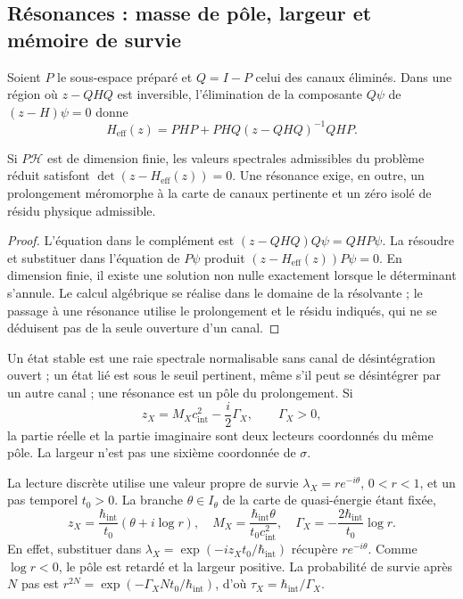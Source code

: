 \subsection{Résonances : masse de pôle, largeur et mémoire de survie}
\label{vi:vi:subsec:resonancias-familias}

Soient \(P\) le sous-espace préparé et \(Q=I-P\) celui des canaux
éliminés. Dans une région où \(z-QHQ\) est inversible, l’élimination
de la composante \(Q\psi\) de \((z-H)\psi=0\) donne
\begin{equation}
 H_{\mathrm{eff}}(z)=PHP+PHQ(z-QHQ)^{-1}QHP.
 \label{vi:vi:eq:feshbach-familias}
\end{equation}

\begin{proposition}
\label{vi:vi:prop:feshbach-familias}
Si \(P\mathcal H\) est de dimension finie, les valeurs spectrales
admissibles du problème réduit satisfont
\(\det(z-H_{\mathrm{eff}}(z))=0\). Une résonance exige, en outre,
un prolongement méromorphe à la carte de canaux pertinente et un zéro
isolé de résidu physique admissible.
\end{proposition}
\begin{proof}
L’équation dans le complément est
\((z-QHQ)Q\psi=QHP\psi\). La résoudre et substituer dans l’équation
de \(P\psi\) produit \((z-H_{\mathrm{eff}}(z))P\psi=0\).
En dimension finie, il existe une solution non nulle exactement lorsque
le déterminant s’annule. Le calcul algébrique se réalise dans le domaine
de la résolvante ; le passage à une résonance utilise le prolongement et le
résidu indiqués, qui ne se déduisent pas de la seule ouverture d’un canal.
\end{proof}

Un état stable est une raie spectrale normalisable sans canal de
désintégration ouvert ; un état lié est sous le seuil
pertinent, même s’il peut se désintégrer par un autre canal ; une résonance est un
pôle du prolongement. Si
\[
 z_X=M_Xc_{\mathrm{int}}^2-\frac{i}{2}\Gamma_X,
 \qquad\Gamma_X>0,
\]
la partie réelle et la partie imaginaire sont deux lecteurs coordonnés du même
pôle. La largeur n’est pas une sixième coordonnée de \(\sigma\).

La lecture discrète utilise une valeur propre de survie
\(\lambda_X=re^{-i\theta}\), \(0<r<1\), et un pas temporel
\(t_0>0\). La branche \(\theta\in I_\theta\) de la carte de
quasi-énergie étant fixée,
\begin{equation}
 z_X=\frac{\hbar_{\mathrm{int}}}{t_0}
 (\theta+i\log r),\quad
 M_X=\frac{\hbar_{\mathrm{int}}\theta}{t_0c_{\mathrm{int}}^2},\quad
 \Gamma_X=-\frac{2\hbar_{\mathrm{int}}}{t_0}\log r.
 \label{vi:vi:eq:anchura-discreta-familias}
\end{equation}
En effet, substituer dans
\(\lambda_X=\exp(-iz_Xt_0/\hbar_{\mathrm{int}})\) récupère
\(re^{-i\theta}\). Comme \(\log r<0\), le pôle est retardé et la
largeur positive. La probabilité de survie après \(N\) pas est
\(r^{2N}=\exp(-\Gamma_XNt_0/\hbar_{\mathrm{int}})\), d’où
\(\tau_X=\hbar_{\mathrm{int}}/\Gamma_X\).

